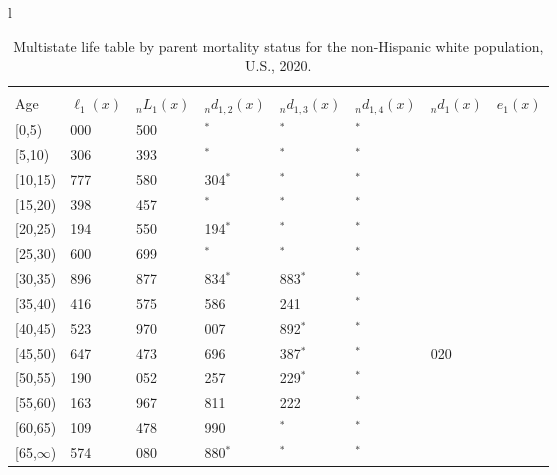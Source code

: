 \documentclass[
]{article}
\begin{document}
\begin{table}
\caption{\label{tab:table-nhwhite}Multistate life table by parent mortality status for the non-Hispanic white population, U.S., 2020.}

\centering
\fontsize{9}{11}\selectfont
\begin{tabular}[t]{l}
\hline
\begin{tabular}{>{\raggedright\arraybackslash}p{.45in}>{\raggedleft\arraybackslash}p{.65in}>{\raggedleft\arraybackslash}p{.65in}>{\raggedleft\arraybackslash}p{.65in}>{\raggedleft\arraybackslash}p{.65in}>{\raggedleft\arraybackslash}p{.65in}>{\raggedleft\arraybackslash}p{.65in}>{\raggedleft\arraybackslash}p{.65in}}
\toprule
\multicolumn{1}{c}{ } & \multicolumn{7}{c}{(1) Lost neither} \\
\cmidrule(l{3pt}r{3pt}){2-8}
Age & $\ell_{1}(x)$ & ${}_nL_{1}(x)$ & ${}_nd_{1,2}(x)$ & ${}_nd_{1,3}(x)$ & ${}_nd_{1,4}(x)$ & ${}_nd_{1}(x)$ & $e_{1}(x)$\\
\midrule
{}[0,5) & 100 000 & 495 500 & 176$^{*}$ & 0$^{*}$ & 0$^{*}$ & 518 & 46\\
{}[5,10) & 99 306 & 491 393 & 481$^{*}$ & 0$^{*}$ & 0$^{*}$ & 48 & 42\\
{}[10,15) & 98 777 & 486 580 & 1 304$^{*}$ & 0$^{*}$ & 0$^{*}$ & 74 & 37\\
{}[15,20) & 97 398 & 479 457 & 969$^{*}$ & 0$^{*}$ & 0$^{*}$ & 236 & 32\\
{}[20,25) & 96 194 & 463 550 & 1 194$^{*}$ & 965$^{*}$ & 0$^{*}$ & 436 & 27\\
\addlinespace
{}[25,30) & 93 600 & 447 699 & 934$^{*}$ & 166$^{*}$ & 0$^{*}$ & 604 & 23\\
{}[30,35) & 91 896 & 424 877 & 1 834$^{*}$ & 1 883$^{*}$ & 0$^{*}$ & 764 & 18\\
{}[35,40) & 87 416 & 387 575 & 2 586 & 2 241 & 203$^{*}$ & 863 & 14\\
{}[40,45) & 81 523 & 355 970 & 3 007 & 1 892$^{*}$ & 0$^{*}$ & 977 & 10\\
{}[45,50) & 75 647 & 274 473 & 5 696 & 2 387$^{*}$ & 354$^{*}$ & 1 020 & 6\\
\addlinespace
{}[50,55) & 66 190 & 185 052 & 5 257 & 1 229$^{*}$ & 542$^{*}$ & 998 & 4\\
{}[55,60) & 58 163 & 97 967 & 4 811 & 2 222 & 227$^{*}$ & 793 & 2\\
{}[60,65) & 50 109 & 37 478 & 1 990 & 738$^{*}$ & 367$^{*}$ & 440 & 1\\
{}[65,$\infty$) & 46 574 & 15 080 & 1 880$^{*}$ & 786$^{*}$ & 754$^{*}$ & 812 & 0\\

\end{tabular}
\end{tabular}
\end{table}
\end{document}

